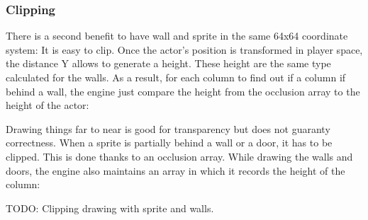 \subsubsection{Clipping}
There is a second benefit to have wall and sprite in the same 64x64 coordinate system: It is easy to clip. Once the actor's position is transformed in player space, the distance Y allows to generate a height. These height are the same type calculated for the walls. As a result, for each column to find out if a column if behind a wall, the engine just compare the height from the occlusion array to the height of the actor:\\
\par
Drawing things far to near is good for transparency but does not guaranty correctness. When a sprite is partially behind a wall or a door, it has to be clipped. This is done thanks to an occlusion array. While drawing the walls and doors, the engine also maintains an array in which it records the height of the column:\\
\par
\begin{minipage}{\textwidth}

\end{minipage}
\begin{minipage}{\textwidth}

\end{minipage}
\begin{minipage}{\textwidth}

\end{minipage}
\par
TODO: Clipping drawing with sprite and walls.\\






